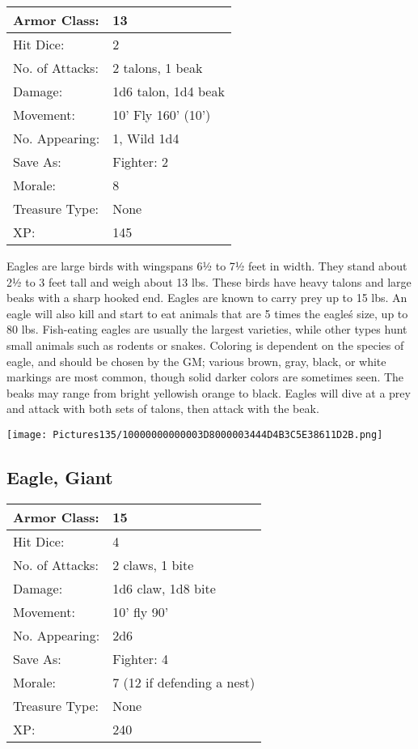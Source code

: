\documentclass[a4paper,twoside,openany,10pt]{book}
\begin{document}
\begin{multicols}{2}
\begin{tabularx}{0.48\textwidth}{@{}lX@{}}
Armor Class: & 13 \\\hline
Hit Dice: & 2 \\\hline
No. of Attacks: & 2 talons, 1 beak \\\hline
Damage: & 1d6 talon, 1d4 beak \\\hline
Movement: & 10' Fly 160' (10') \\\hline
No. Appearing: & 1, Wild 1d4 \\\hline
Save As: & Fighter: 2 \\\hline
Morale: & 8 \\\hline
Treasure Type: & None \\\hline
XP: & 145 \\\hline
\end{tabularx}\medskip

Eagles are large birds with wingspans 6½ to 7½ feet in width. They stand about 2½ to 3 feet tall and weigh about 13 lbs. These birds have heavy talons and large beaks with a sharp hooked end. Eagles are known to carry prey up to 15 lbs. An eagle will also kill and start to eat animals that are 5 times the eagle\'s size, up to 80 lbs. Fish-eating eagles are usually the largest varieties, while other types hunt small animals such as rodents or snakes. Coloring is dependent on the species of eagle, and should be chosen by the GM; various brown, gray, black, or white markings are most common, though solid darker colors are sometimes seen. The beaks may range from bright yellowish orange to black. Eagles will dive at a prey and attack with both sets of talons, then attack with the beak.

\begin{center}
	\texttt{[image: Pictures135/10000000000003D8000003444D4B3C5E38611D2B.png]}
\end{center}

\subsection*{Eagle, Giant}\label{eagle-giant}

\begin{tabularx}{0.48\textwidth}{@{}lX@{}}
Armor Class: & 15 \\\hline
Hit Dice: & 4 \\\hline
No. of Attacks: & 2 claws, 1 bite \\\hline
Damage: & 1d6 claw, 1d8 bite \\\hline
Movement: & 10' fly 90' \\\hline
No. Appearing: & 2d6 \\\hline
Save As: & Fighter: 4 \\\hline
Morale: & 7 (12 if defending a nest) \\\hline
Treasure Type: & None \\\hline
XP: & 240 \\\hline
\end{tabularx}\medskip


\end{multicols}
\end{document}
